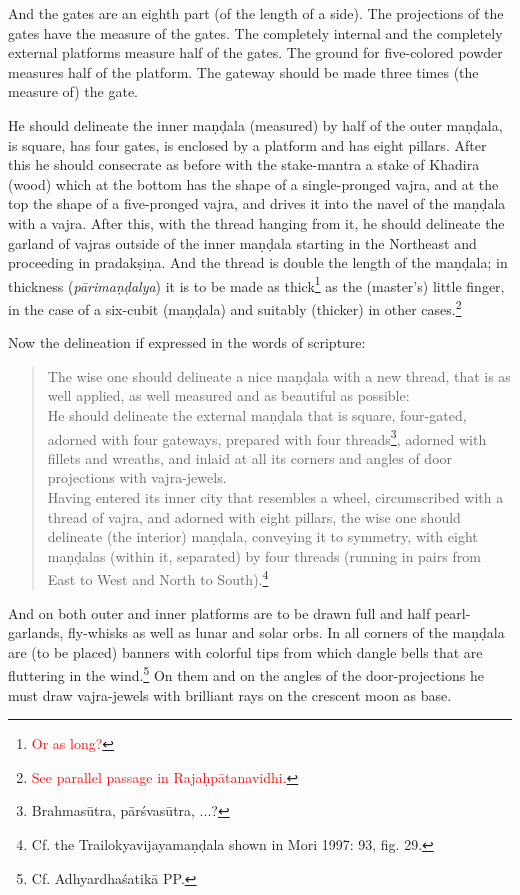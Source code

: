 \documentclass[11pt]{book}
\newcommand{\red}[1]{\textcolor{red}{#1}}
\newcommand{\skt}[1]{\emph{#1}}
\begin{document}
And the gates are an eighth part (of the length of a side). The projections of the gates have the measure of the gates. The completely internal and the completely external platforms measure half of the gates. The ground for five-colored powder measures half of the platform. The gateway should be made three times (the measure of) the gate.

He should delineate the inner maṇḍala (measured) by half of the outer maṇḍala, is square, has four gates, is enclosed by a platform and has eight pillars. After this he should consecrate as before with the stake-mantra a stake of Khadira (wood) which at the bottom has the shape of a single-pronged vajra, and at the top the shape of a five-pronged vajra, and drives it into the navel of the maṇḍala with a vajra. After this, with the thread hanging from it, he should delineate the garland of vajras outside of the inner maṇḍala starting in the Northeast and proceeding in pradakṣiṇa. And the thread is double the length of the maṇḍala; in thickness (\skt{pārimaṇḍalya}) it is to be made as thick\footnote{\red{Or as long?}} as the (master's) little finger, in the case of a six-cubit (maṇḍala) and suitably (thicker) in other cases.\footnote{\red{See parallel passage in Rajaḥpātanavidhi.}}

Now the delineation if expressed in the words of scripture:

\begin{verse}
The wise one should delineate a nice maṇḍala with a new thread, that is as well applied, as well measured and as beautiful as possible:\\
He should delineate the external maṇḍala that is square, four-gated, adorned with four gateways, prepared with four threads\footnote{Brahmasūtra, pārśvasūtra, ...?}, adorned with fillets and wreaths, and inlaid at all its corners and angles of door projections with vajra-jewels.\\
Having entered its inner city that resembles a wheel, circumscribed with a thread of vajra, and adorned with eight pillars, the wise one should delineate (the interior) maṇḍala, conveying it to symmetry, with eight maṇḍalas (within it, separated) by four threads (running in pairs from East to West and North to South).\footnote{Cf. the Trailokyavijayamaṇḍala shown in Mori 1997: 93, fig. 29.}
\end{verse}

And on both outer and inner platforms are to be drawn full and half pearl-garlands, fly-whisks as well as lunar and solar orbs. In all corners of the maṇḍala are (to be placed) banners with colorful tips from which dangle bells that are fluttering in the wind.\footnote{Cf. Adhyardhaśatikā PP.} On them and on the angles of the door-projections he must draw vajra-jewels with brilliant rays on the crescent moon as base.
\end{document}
